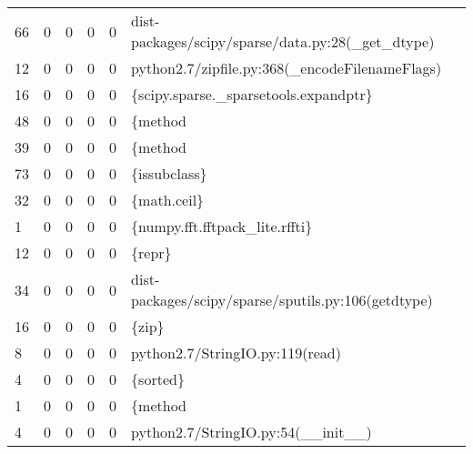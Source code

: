 \begin{tabular}{lrrrrl}
 66       &     0     &     0     &     0     &     0     & dist-packages/scipy/sparse/data.py:28(\_get\_dtype)                        \\
 12       &     0     &     0     &     0     &     0     & python2.7/zipfile.py:368(\_encodeFilenameFlags)                           \\
 16       &     0     &     0     &     0     &     0     & \{scipy.sparse.\_sparsetools.expandptr\}                                    \\
 48       &     0     &     0     &     0     &     0     & \{method                                                                  \\
 39       &     0     &     0     &     0     &     0     & \{method                                                                  \\
 73       &     0     &     0     &     0     &     0     & \{issubclass\}                                                             \\
 32       &     0     &     0     &     0     &     0     & \{math.ceil\}                                                              \\
 1        &     0     &     0     &     0     &     0     & \{numpy.fft.fftpack\_lite.rffti\}                                           \\
 12       &     0     &     0     &     0     &     0     & \{repr\}                                                                   \\
 34       &     0     &     0     &     0     &     0     & dist-packages/scipy/sparse/sputils.py:106(getdtype)                      \\
 16       &     0     &     0     &     0     &     0     & \{zip\}                                                                    \\
 8        &     0     &     0     &     0     &     0     & python2.7/StringIO.py:119(read)                                          \\
 4        &     0     &     0     &     0     &     0     & \{sorted\}                                                                 \\
 1        &     0     &     0     &     0     &     0     & \{method                                                                  \\
 4        &     0     &     0     &     0     &     0     & python2.7/StringIO.py:54(\_\_init\_\_)                                       \\

\end{tabular}
